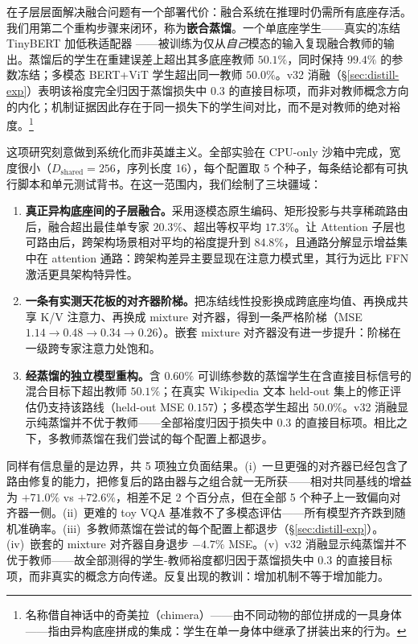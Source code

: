 \documentclass[10pt,twoside]{article}
\begin{document}
在子层层面解决融合问题有一个部署代价：融合系统在推理时仍需所有底座存活。我们用第二个重构步骤来闭环，称为\textbf{嵌合蒸馏}。一个单底座学生——真实的冻结 TinyBERT \citep{jiao2020} 加低秩适配器 \citep{hu2022}——被训练为仅从\emph{自己}模态的输入复现融合教师的输出。蒸馏后的学生在重建误差上超出其多底座教师 $50.1\%$，同时保持 $99.4\%$ 的参数冻结；多模态 BERT+ViT 学生超出同一教师 $50.0\%$。v32 消融（\S\ref{sec:distill-exp}）表明该裕度完全归因于蒸馏损失中 $0.3$ 的直接目标项，而非对教师概念方向的内化；机制证据因此存在于同一损失下的学生间对比，而不是对教师的绝对裕度。\footnote{名称借自神话中的奇美拉（chimera）——由不同动物的部位拼成的一具身体——指由异构底座拼成的集成：学生在单一身体中继承了拼装出来的行为。}

这项研究刻意做到系统化而非英雄主义。全部实验在 CPU-only 沙箱中完成，宽度很小（$D_{\text{shared}}{=}256$，序列长度 16），每个配置取 5 个种子，每条结论都有可执行脚本和单元测试背书。在这一范围内，我们绘制了三块疆域：

\begin{enumerate}
    \item \textbf{真正异构底座间的子层融合。}采用逐模态原生编码、矩形投影与共享稀疏路由后，融合超出最佳单专家 $20.3\%$、超出等权平均 $17.3\%$。让 Attention 子层也可路由后，跨架构场景相对平均的裕度提升到 $84.8\%$，且通路分解显示增益集中在 attention 通路：跨架构差异主要显现在注意力模式里，其行为远比 FFN 激活更具架构特异性。
    \item \textbf{一条有实测天花板的对齐器阶梯。}把冻结线性投影换成跨底座均值、再换成共享 K/V 注意力、再换成 mixture 对齐器，得到一条严格阶梯（MSE $1.14 \rightarrow 0.48 \rightarrow 0.34 \rightarrow 0.26$）。嵌套 mixture 对齐器没有进一步提升：阶梯在一级跨专家注意力处饱和。
    \item \textbf{经蒸馏的独立模型重构。}含 $0.60\%$ 可训练参数的蒸馏学生在含直接目标信号的混合目标下超出教师 $50.1\%$；在真实 Wikipedia 文本 held-out 集上的修正评估仍支持该路线（held-out MSE $0.157$）；多模态学生超出 $50.0\%$。v32 消融显示纯蒸馏并不优于教师——全部裕度归因于损失中 $0.3$ 的直接目标项。相比之下，多教师蒸馏在我们尝试的每个配置上都退步。
\end{enumerate}

同样有信息量的是边界，共 5 项独立负面结果。(i)~一旦更强的对齐器已经包含了路由修复的能力，把修复后的路由器与之组合就一无所获——相对共同基线的增益为 $+71.0\%$ vs $+72.6\%$，相差不足 2 个百分点，但在全部 5 个种子上一致偏向对齐器一侧。(ii)~更难的 toy VQA 基准救不了多模态评估——所有模型齐齐跌到随机准确率。(iii)~多教师蒸馏在尝试的每个配置上都退步（\S\ref{sec:distill-exp}）。(iv)~嵌套的 mixture 对齐器自身退步 $-4.7\%$ MSE。(v)~v32 消融显示纯蒸馏并不优于教师——故全部测得的学生-教师裕度都归因于蒸馏损失中 $0.3$ 的直接目标项，而非真实的概念方向传递。反复出现的教训：增加机制不等于增加能力。
\end{document}
